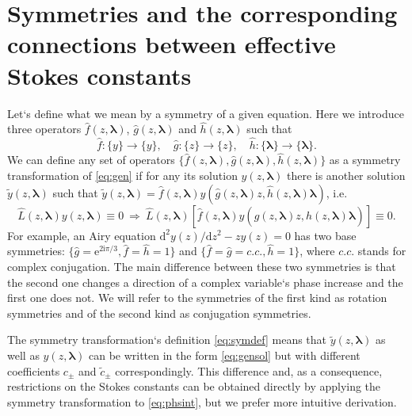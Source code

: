 \documentclass[atmp]{ipart_v1}
\def\rmd{\mathrm{d}}
\def\rme{\mathrm{e}}
\def\rmi{\mathrm{i}}
\def\f{\hat{f}}
\def\g{\hat{g}}
\def\h{\hat{h}}
\def\LL{\widehat{L}}
\def\lmbd{\bm{\lambda}}
\def\unity{1}
\newcommand\eref[1]{\eqref{#1}}
\begin{document}
\section{Symmetries and the corresponding connections between effective Stokes constants \label{sec:smmtrs}}
Let`s define what we mean by a symmetry of a given equation. Here we introduce three operators
$\f(z,\lmbd)$, $\g(z,\lmbd)$ and $\h(z,\lmbd)$ such that
\begin{equation}
\f:\{y\} \rightarrow \{y\}, \quad
\g:\{z\} \rightarrow \{z\}, \quad
\h:\{\lmbd\} \rightarrow \{\lmbd\}.
\end{equation}
We can define any set of operators $\{\f(z,\lmbd),\g(z,\lmbd),\h(z,\lmbd)\}$ as a symmetry 
transformation of \eref{eq:gen}
if for any its solution $y(z,\lmbd)$ there is another solution $\tilde{y}(z,\lmbd)$ such that
$\tilde{y}(z,\lmbd)=\f(z,\lmbd)y(\g(z,\lmbd)z,\h(z,\lmbd)\lmbd)$, i.e.
\begin{equation}
\LL(z,\lmbd)y(z,\lmbd) \equiv 0 \ \Longrightarrow\  
\LL(z,\lmbd) \left[ \f(z,\lmbd)y(\g(z,\lmbd)z,\h(z,\lmbd)\lmbd) \right] \equiv 0.   \label{eq:symdef}
\end{equation}
For example, an Airy equation $\rmd^2 y(z)/\rmd z^2 - z y(z) = 0$ has two base symmetries: 
$\{\g=\rme^{2 \rmi \pi/3},\f=\h=\unity\}$ and $\{\f=\g=c.c.,\h=\unity\}$, where 
$c.c.$ stands 
for complex conjugation. The main difference between these two symmetries is that the second 
one changes a direction of a complex variable`s phase increase and the first one does not. 
We will refer to the symmetries of the first kind as rotation symmetries and of the second 
kind as conjugation symmetries.

The symmetry transformation`s definition \eref{eq:symdef} means that 
$\tilde{y}(z,\lmbd)$ as well as $y(z,\lmbd)$ can be written in the form \eref{eq:gensol}
but with different coefficients $c_\pm$ and $\tilde{c}_\pm$ correspondingly. 
This difference and, as a consequence, restrictions on the Stokes constants 
can be obtained directly by applying the symmetry transformation to \eref{eq:phsint}, 
but we prefer more intuitive derivation.
\end{document}
